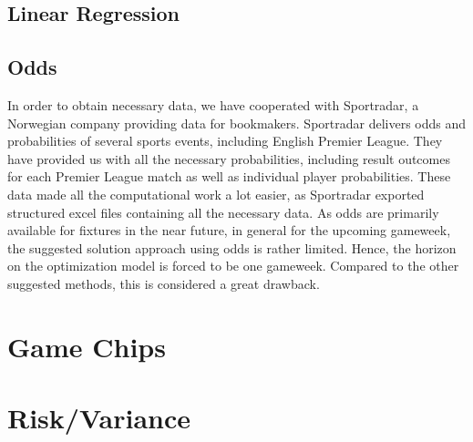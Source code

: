 \subsection{Linear Regression}
\subsection{Odds}
In order to obtain necessary data, we have cooperated with Sportradar, a Norwegian company providing data for bookmakers. Sportradar delivers odds and probabilities of several sports events, including English Premier League. They have provided us with all the necessary probabilities, including result outcomes for each Premier League match as well as individual player probabilities. These data made all the computational work a lot easier, as Sportradar exported structured excel files containing all the necessary data. 
\newpar
As odds are primarily available for fixtures in the near future, in general for the upcoming gameweek, the suggested solution approach using odds is rather limited. Hence, the horizon on the optimization model is forced to be one gameweek. Compared to the other suggested methods, this is considered a great drawback.
\section{Game Chips}
\section{Risk/Variance}